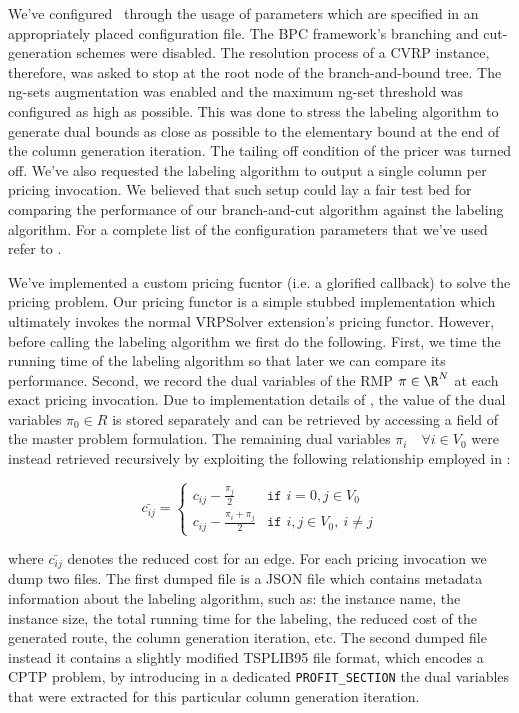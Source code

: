 \medskip

We've configured \bapcod\ through the usage of parameters which are specified
in an appropriately placed configuration file.
The BPC framework's branching and cut-generation schemes were disabled.
The resolution process of a CVRP instance, therefore, was asked to stop at
the root node of the branch-and-bound tree.
The ng-sets augmentation was enabled and the maximum ng-set threshold was configured
as high as possible. This was done to stress the labeling algorithm to generate dual bounds as close
as possible to the elementary bound at the end of the column generation iteration.
The tailing off condition of the pricer was turned off.
We've also requested the labeling algorithm to output a single column per pricing invocation.
We believed that such setup could lay a fair test bed
for comparing the performance of our branch-and-cut algorithm against
the labeling algorithm.
For a complete list of the configuration parameters
that  we've used refer to .

\medskip

We've implemented a custom pricing fucntor (i.e. a glorified callback) to solve the pricing problem.
Our pricing functor is a simple stubbed implementation which ultimately invokes
the normal VRPSolver extension's pricing functor.
However, before calling the labeling algorithm we first do the following.
First, we time the running time of the labeling algorithm so that later
we can compare its performance.
Second, we record the dual variables of the RMP $\pi \in \R^N$ at each
exact pricing invocation.
Due to implementation details of \bapcod, the value of
the dual variables $\pi_0 \in R$ is stored separately
and can be retrieved by accessing a field of the master problem formulation.
The remaining dual variables $\pi_i \quad \forall i \in V_0$
were instead retrieved recursively by exploiting the following relationship
employed in \bapcod:

\begin{equation}
	\bar{c_{ij}} = \begin{cases}
		c_{ij} - \frac{\pi_{j}}{2}       & \texttt{if } i = 0, j \in V_0       \\
		c_{ij} - \frac{\pi_i + \pi_j}{2} & \texttt{if } i, j \in V_0,\ i \ne j
	\end{cases}
\end{equation}

where $\bar{c_{ij}}$ denotes the reduced cost for an edge.
For each pricing invocation we dump two files.
The first dumped file is a JSON file which contains metadata information about
the labeling algorithm, such as: the instance name, the instance size,
the total running time for the labeling, the reduced cost of the generated route,
the column generation iteration, etc.
The second dumped file instead it contains a slightly modified TSPLIB95 file format,
which encodes a CPTP problem, by introducing in a dedicated \texttt{PROFIT\_SECTION}
the dual variables that were extracted for this particular column generation iteration.

